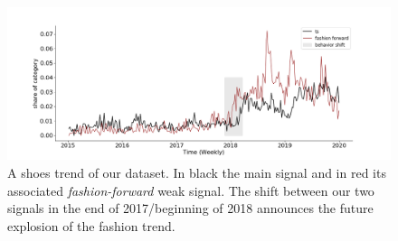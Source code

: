 \documentclass{article} %
\begin{document}







\begin{figure}
  \centering
    \includegraphics[width=1.\linewidth]{figure/ff_example}
  \caption{A shoes trend of our dataset. In black the main signal and in red its associated \textit{fashion-forward} weak signal. The shift between our two signals in the end of 2017/beginning of 2018 announces the future explosion of the fashion trend.}
\label{fig:oneemergingtrend}
\end{figure}
\end{document}
